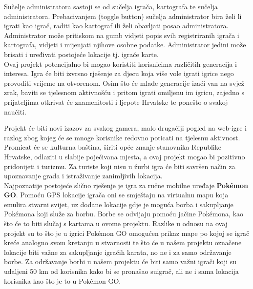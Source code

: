 		\textnormal{Sučelje administratora sastoji se od sučelja igrača, kartografa te sučelja administratora. Prebacivanjem (toggle button) sučelja administrator bira želi li igrati kao igrač, raditi kao kartograf ili želi obavljati posao administratora. Administrator može pritiskom na gumb vidjeti popis svih registriranih igrača i kartografa, vidjeti i mijenjati njihove osobne podatke. Administrator jedini može brisati i uređivati postojeće lokacije tj. igraće karte.}\\
		
		
		\textnormal{Ovaj projekt potencijalno bi mogao koristiti korisnicima različitih generacija i interesa. Igra će biti izvrsno rješenje za djecu koja više vole igrati igrice nego provoditi vrijeme na otvorenom. Osim što će mlađe generacije izaći van na svjež zrak, baviti se tjelesnom aktivnošću i pritom igrati omiljenu im igricu, zajedno s prijateljima otkrivat će znamenitosti i ljepote Hrvatske te ponešto o svakoj naučiti.}
		
		\textnormal{Projekt će biti novi izazov za svakog gamera, malo drugačiji pogled na web-igre i razlog zbog kojeg će se mnoge korisnike redovno poticati na tjelesnu aktivnost. Promicat će se kulturna baština, širiti opće znanje stanovnika Republike Hrvatske, odlaziti u slabije pojećivana mjesta, a ovaj projekt mogao bi pozitivno pridonijeti i turizmu. Za turiste koji nisu u žurbi igra će biti savršen način za upoznavanje grada i istraživanje zanimljivih lokacija.}\\
		
		
		\textnormal{Najpoznatije postojeće slično rješenje je igra za ručne mobilne uređaje \textbf{Pokémon GO}. Pomoću GPS lokacije igrača oni se smještaju na virtualnu mapu koja emulira stvarni svijet, uz dodane lokacije gdje je moguća borba i sakupljanje Pokémona koji služe za borbu. Borbe se odvijaju pomoću jačine Pokémona, kao što će to biti slučaj s kartama u ovome projektu. Razlike u odnosu na ovaj projekt su to što je u igrici Pokémon GO omogućen prikaz mape po kojoj se igrač kreće analogno svom kretanju u stvarnosti te što će u našem projektu označene lokacije biti važne za sakupljanje igraćih karata, no ne i za samo održavanje borbe. Za održavanje borbi u našem projektu će biti samo važni igrači koji su udaljeni 50 km od korisnika kako bi se pronašao suigrač, ali ne i sama lokacija korisnika kao što je to u Pokémon GO.    }
		

